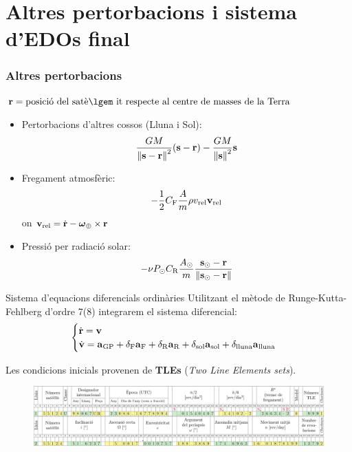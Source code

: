 \documentclass{beamer} %
\begin{document}
\section{Altres pertorbacions i sistema d'EDOs final}
\begin{frame}
  \frametitle{Altres pertorbacions}
  $\vf{r} = \text{posició del satè\lgem it respecte al centre de masses de la Terra}$

  \vspace{0.25cm}
  \begin{itemize}
    \item<1-> Pertorbacions d'altres cossos (Lluna i Sol):
      $$\frac{GM}{\left\|\boldsymbol{\mathrm{s}}-\boldsymbol{\mathrm{r}}\right\|^2}(\boldsymbol{\mathrm{s}}-\boldsymbol{\mathrm{r}}) - \frac{GM}{\left\|\boldsymbol{\mathrm{s}}\right\|^2}\boldsymbol{\mathrm{s}}$$
    \item<2-> Fregament atmosfèric: $$-\frac{1}{2}C_\mathrm{F} \frac{A}{m}\rho v_\mathrm{rel}\boldsymbol{\mathrm{v}}_\mathrm{rel}$$
      on $\boldsymbol{\mathrm{v}}_\mathrm{rel}=\dot{\boldsymbol{\mathrm{r}}}-\boldsymbol{\mathrm{\omega}}_\oplus\times\boldsymbol{\mathrm{r}}$
    \item<3-> Pressió per radiació solar: $$
        -\nu P_\odot C_\mathrm{R} \frac{A_\odot}{m} \frac{\boldsymbol{\mathrm{s}}_\odot-\boldsymbol{\mathrm{r}}}{\left\|\boldsymbol{\mathrm{s}}_\odot-\boldsymbol{\mathrm{r}}\right\|}
      $$
  \end{itemize}
\end{frame}
\begin{frame}{Sistema d'equacions diferencials ordinàries}
  Utilitzant el mètode de Runge-Kutta-Fehlberg d'ordre 7(8) integrarem el sistema diferencial:
  \begin{equation*}
    \begin{cases}
      \dot{\boldsymbol{\mathrm{r}}}=\boldsymbol{\mathrm{v}} \\
      \dot{\boldsymbol{\mathrm{v}}}=\boldsymbol{\mathrm{a}}_{\mathrm{GP}} + \delta_{\mathrm{F}}\boldsymbol{\mathrm{a}}_{\mathrm{F}}+\delta_{\mathrm{R}}\boldsymbol{\mathrm{a}}_{\mathrm{R}}+\delta_{\mathrm{sol}}\boldsymbol{\mathrm{a}}_{\mathrm{sol}}+\delta_{\mathrm{lluna}}\boldsymbol{\mathrm{a}}_\mathrm{lluna}
    \end{cases}
  \end{equation*}
  \pause
  \vspace{0.25cm}

  Les condicions inicials provenen de \textbf{TLEs} (\emph{Two Line Elements sets}).
  \begin{figure}
    \centering
    \includegraphics[width=\textwidth]{../Images/TLE_ca.pdf}
  \end{figure}
\end{frame}
\end{document}
